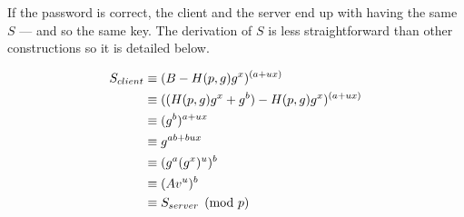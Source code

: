 \documentclass[../report.tex]{subfiles}
\begin{document}
If the password is correct, the client and the server end up with having the same $S$ --- and so the same key. The derivation of $S$ is less straightforward than other constructions so it is detailed below.

\begin{align*}
 S_{client}
 &\equiv (B - H(p, g) g^x)^{(a+ux)}\notag\\
 &\equiv ((H(p, g) g^x + g^b) - H(p, g) g^x)^{(a+ux)}\notag\\
 &\equiv (g^b)^{a+ux}\notag\\
 &\equiv g^{ab+bux}\notag\\
 &\equiv (g^a (g^x)^u)^b\notag\\
 &\equiv (Av^u)^b\notag\\
 &\equiv S_{server} \pmod{p}
\end{align*}











\end{document}
